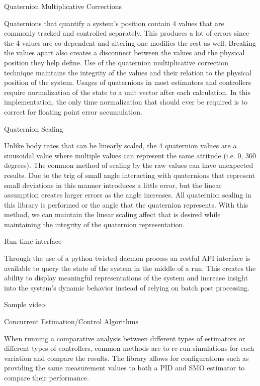 Quaternion Multiplicative Corrections

Quaternions that quantify a system's position contain 4 values that are commonly tracked and controlled separately. This produces a lot of errors since the 4 values are co-dependent and altering one modifies the rest as well. Breaking the values apart also creates a disconnect between the values and the physical position they help define. Use of the quaternion multiplicative correction technique maintains the integrity of the values and their relation to the physical position of the system. Usages of quaternions in most estimators and controllers require normalization of the state to a unit vector after each calculation. In this implementation, the only time normalization that should ever be required is to correct for floating point error accumulation.

Quaternion Scaling

Unlike body rates that can be linearly scaled, the 4 quaternion values are a sinusoidal value where multiple values can represent the same attitude (i.e. 0, 360 degrees). The common method of scaling by the raw values can have unexpected results. Due to the trig of small angle interacting with quaternions that represent small deviations in this manner introduces a little error, but the linear assumption creates larger errors as the angle increases. All quaternion scaling in this library is performed or the angle that the quaternion represents. With this method, we can maintain the linear scaling affect that is desired while maintaining the integrity of the quaternion representation.

Run-time interface

Through the use of a python twisted daemon process an restful API interface is available to query the state of the system in the middle of a run. This creates the ability to display meaningful representations of the system and increase insight into the system's dynamic behavior instead of relying on batch post processing.

Sample video

Concurrent Estimation/Control Algorithms

When running a comparative analysis between different types of estimators or different types of controllers, common methods are to re-run simulations for each variation and compare the results. The library allows for configurations such as providing the same measurement values to both a PID and SMO estimator to compare their performance.

